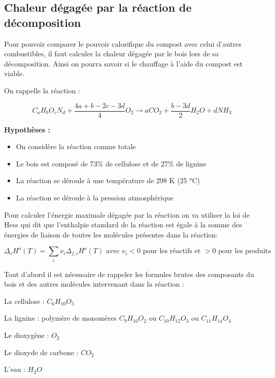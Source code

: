 \documentclass[../PS6_RapportFinal.tex]{subfiles}
\begin{document}
\graphicspath{{img/}{tex/img/}}
\subsection{Chaleur dégagée par la réaction de décomposition  }
 
Pour pouvoir comparer le pouvoir calorifique du compost avec celui d’autres combustibles, il faut calculer la chaleur dégagée par le bois lors de sa décomposition. Ainsi on pourra savoir si le chauffage à l'aide du compost est viable.

On rappelle la réaction :

\[C_aH_bO_cN_d + \frac{4a + b - 2c -3d}{4}O_2 \longrightarrow aCO_2+ \frac{b-3d}{2} H_2O + dNH_3\]

\textbf{Hypothèses :}
\begin{itemize}
\item On considère la réaction comme totale 
\item Le bois est composé de 73\% de cellulose et de 27\% de lignine %

\item La réaction se déroule à une température de 298 \si{\kelvin} (25 \si{\degreeCelsius})
\item La réaction se déroule à la pression atmosphérique 
\end{itemize}
 
Pour calculer l’énergie maximale dégagée par la réaction on va utiliser la loi de Hess qui dit que l'enthalpie standard de la réaction est égale à la somme des énergies de liaison de toutes les molécules présentes dans la réaction:

\[\Delta_r H^o(T) = \sum_i \nu_i \Delta_{f,i}H^o(T) \text{ avec }\nu_i < 0 \text{ pour les réactifs et }>0 \text{ pour les produits}\] 

Tout d’abord il est nécessaire de rappeler les formules brutes des composants du bois et des autres molécules intervenant dans la réaction :
\begin{description}
\item La cellulose : \(C_6 H_{10} O_5\) %
\item La lignine : polymère de monomères \(C_9 H_{10} O_2\) ou \(C_{10} H_{12} O_3\) ou \(C_{11} H_{14} O_4\)

\item Le dioxygène : \(O_2\) \
\item Le dioxyde de carbone : \(CO_2\)
\item L'eau : \(H_2O\)
\end{description}
\end{document}
